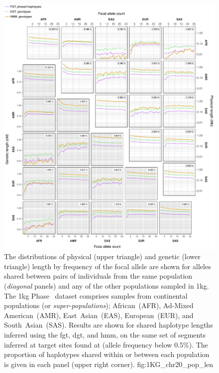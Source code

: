 

\begin{figure}[p]
\includegraphics[width=\textwidth]{./img/ch4/1KG_chr20_pop_len}
{The distributions of physical (upper triangle) and genetic (lower triangle) length by frequency of the focal allele are shown for alleles shared between pairs of individuals from the same population (\emph{diagonal} panels) and any of the other populations sampled in \gls{1kg}.
The \gls{1kg} Phase~ dataset comprises samples from  continental populations (or \emph{super-populations});
African~(AFR), Ad-Mixed American~(AMR), East~Asian~(EAS), European~(EUR), and South~Asian~(SAS).
Results are shown for shared haplotype lengths inferred using the \gls{fgt}, \gls{dgt}, and \gls{hmm}, on the same set of segments inferred at target sites found at \fk{[2,25]} (\ie allele frequency below 0.5\%).
The proportion of haplotypes shared within or between each population is given in each panel (upper right corner).\AdditionLabel}
{fig:1KG_chr20_pop_len}
\end{figure}
